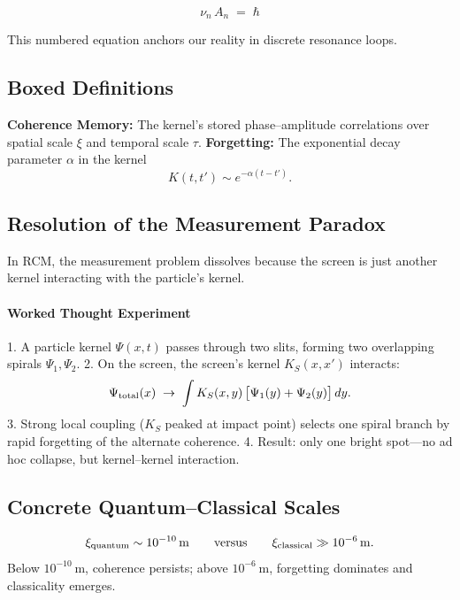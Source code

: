 \begin{equation}\label{eq:quant_principle}
\nu_n\,A_n \;=\;\hbar
\tag{1}
\end{equation}

This numbered equation anchors our reality in discrete resonance loops.

\subsection{Boxed Definitions}

\begin{framed}
\textbf{Coherence Memory:}  The kernel’s stored phase–amplitude correlations over spatial scale $\xi$ and temporal scale $\tau$.  
\textbf{Forgetting:}  The exponential decay parameter $\alpha$ in the kernel 
\[
K(t,t') \sim e^{-\alpha (t - t')}.
\]
\end{framed}

\subsection{Resolution of the Measurement Paradox}

In RCM, the measurement problem dissolves because the screen is just another kernel interacting with the particle’s kernel.

\paragraph{Worked Thought Experiment}  
1. A particle kernel $\Psi(x,t)$ passes through two slits, forming two overlapping spirals $\Psi_1,\Psi_2$.  
2. On the screen, the screen’s kernel $K_S(x,x')$ interacts:  
   \[
     \Psi_{\rm total}(x) \;\to\; \int K_S(x,y)\,\bigl[\Psi_1(y)+\Psi_2(y)\bigr]\,dy.
   \]
3. Strong local coupling ($K_S$ peaked at impact point) selects one spiral branch by rapid forgetting of the alternate coherence.  
4. Result: only one bright spot—no ad hoc collapse, but kernel–kernel interaction.

\subsection{Concrete Quantum–Classical Scales}

\[
\xi_{\rm quantum}\sim10^{-10}\,\mathrm{m}
\qquad\text{versus}\qquad
\xi_{\rm classical}\gg10^{-6}\,\mathrm{m}.
\]
Below $10^{-10}$ m, coherence persists; above $10^{-6}$ m, forgetting dominates and classicality emerges.

